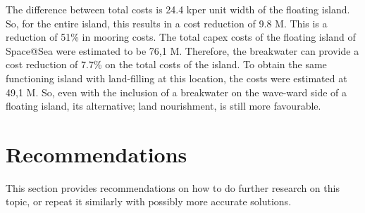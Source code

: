 The difference between total costs is 24.4 k\texteuro per unit width of the floating island. So, for the entire island, this results in a cost reduction of 9.8 M\texteuro. This is a reduction of 51\% in mooring costs. The total \acrshort{capex} costs of the floating island of Space@Sea were estimated to be 76,1 M\texteuro. Therefore, the breakwater can provide a cost reduction of 7.7\% on the total costs of the island. To obtain the same functioning island with land-filling at this location, the costs were estimated at 49,1 M\texteuro. So, even with the inclusion of a breakwater on the wave-ward side of a floating island, its alternative; land nourishment, is still more favourable. 


\section{Recommendations}

This section provides recommendations on how to do further research on this topic, or repeat it similarly with possibly more accurate solutions. 


